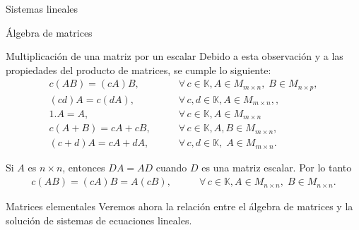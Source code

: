 \documentclass[a4paper,12pt,twoside,spanish]{amsbook}
\theoremstyle{definition}
\theoremstyle{remark}
\newcommand{\K}{\mathbb K}
\begin{document}
\begin{chapter}{Sistemas lineales}
\begin{section}{Álgebra de matrices}
\begin{subsection}{Multiplicación de una matriz por un escalar}
		Debido a esta observación y a las propiedades del producto de matrices, se cumple lo siguiente:
			\begin{align*}
			 c(A B) = (cA) B,\qquad &\forall\, c \in \K,  A \in M_{m \times n}, \;B \in M_{n \times p}, \\
			 (cd)A = c(dA),  \qquad &\forall\, c,d \in \K,  A \in M_{m \times n},, \\
			1.A = A ,\qquad&\forall\, c \in \K, A \in M_{m \times n}\\
			c(A + B) = cA + cB,\qquad& \forall\, c \in \K, A,B \in M_{m \times n}, \\
			(c+ d)A = cA + dA,\qquad& \forall\, c,d \in \K, \; A \in M_{m \times n}.
			\end{align*}
			
			Si $A$ es $n \times n$,  entonces $DA = AD$ cuando $D$  es una matriz escalar. Por lo tanto
			\begin{align*}
			c(A B) = (cA) B = A(cB),\qquad &\forall\, c \in \K,  A \in M_{n \times n}, \;B \in M_{n \times n}.
			\end{align*} 

		\end{subsection}
			
			
		\end{section}
		
		\begin{section}{Matrices elementales}
			Veremos ahora la relación entre el álgebra de matrices y la solución de sistemas de ecuaciones lineales. 
			

\end{section}
\end{chapter}
\end{document}
